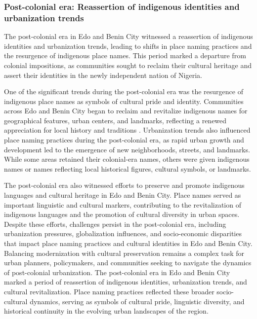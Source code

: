 \subsubsection{Post-colonial era: Reassertion of indigenous identities and urbanization trends}
The post-colonial era in Edo and Benin City witnessed a reassertion of indigenous identities and urbanization trends, leading to shifts in place naming practices and the resurgence of indigenous place names. This period marked a departure from colonial impositions, as communities sought to reclaim their cultural heritage and assert their identities in the newly independent nation of Nigeria\cite{reynolds}.

One of the significant trends during the post-colonial era was the resurgence of indigenous place names as symbols of cultural pride and identity. Communities across Edo and Benin City began to reclaim and revitalize indigenous names for geographical features, urban centers, and landmarks, reflecting a renewed appreciation for local history and traditions \cite{Davis1999african}.
Urbanization trends also influenced place naming practices during the post-colonial era, as rapid urban growth and development led to the emergence of new neighborhoods, streets, and landmarks. While some areas retained their colonial-era names, others were given indigenous names or names reflecting local historical figures, cultural symbols, or landmarks.

The post-colonial era also witnessed efforts to preserve and promote indigenous languages and cultural heritage in Edo and Benin City. Place names served as important linguistic and cultural markers, contributing to the revitalization of indigenous languages and the promotion of cultural diversity in urban spaces\cite{Davis1999african}.
Despite these efforts, challenges persist in the post-colonial era, including urbanization pressures, globalization influences, and socio-economic disparities that impact place naming practices and cultural identities in Edo and Benin City. Balancing modernization with cultural preservation remains a complex task for urban planners, policymakers, and communities seeking to navigate the dynamics of post-colonial urbanization.
The post-colonial era in Edo and Benin City marked a period of reassertion of indigenous identities, urbanization trends, and cultural revitalization. Place naming practices reflected these broader socio-cultural dynamics, serving as symbols of cultural pride, linguistic diversity, and historical continuity in the evolving urban landscapes of the region.

